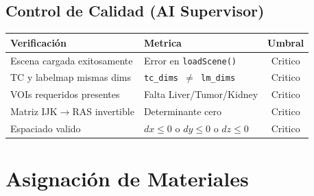 \documentclass[12pt,a4paper]{article}
\begin{document}
\begin{tcolorbox}[aiSupervisor]

\begin{tcolorbox}[aiSupervisor]
\subsection*{Control de Calidad (AI Supervisor)}

\begin{table}[H]
\centering
\begin{tabular}{llc}
\toprule
\textbf{Verificación} & \textbf{Metrica} & \textbf{Umbral} \\
\midrule
Escena cargada exitosamente & Error en \texttt{loadScene()} & Critico \\
TC y labelmap mismas dims & \texttt{tc\_dims $\neq$ lm\_dims} & Critico \\
VOIs requeridos presentes & Falta Liver/Tumor/Kidney & Critico \\
Matriz IJK$\to$RAS invertible & Determinante cero & Critico \\
Espaciado valido & $dx \leq 0$ o $dy \leq 0$ o $dz \leq 0$ & Critico \\
\bottomrule
\end{tabular}
\end{table}

\newpage


\newpage


\newpage


\newpage

\end{tcolorbox}
\end{tcolorbox}
\section{Asignación de Materiales}
\label{sec:materiales}
\end{document}
